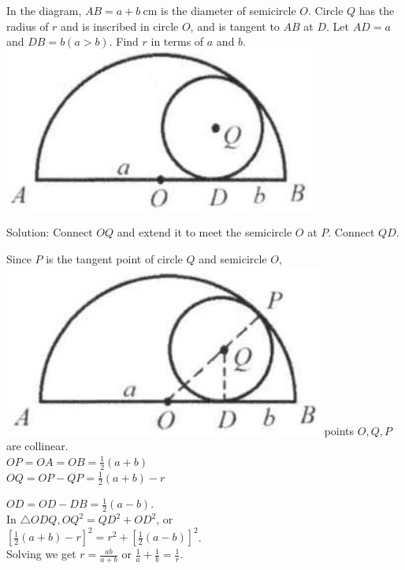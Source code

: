 \documentclass{article}
\begin{document}
In the diagram, \(A B=a+b \mathrm{~cm}\) is the diameter of semicircle \(O\). Circle \(Q\) has the radius of \(r\) and is inscribed in circle \(O\), and is tangent to \(A B\) at \(D\). Let \(A D=a\) and \(D B=b(a>b)\). Find \(r\) in terms of \(a\) and \(b\).\\
\centering
\includegraphics[width=\textwidth]{images/178(1).jpg}

Solution:
Connect \(O Q\) and extend it to meet the semicircle \(O\) at \(P\). Connect \(Q D\).

Since \(P\) is the tangent point of circle \(Q\) and semicircle \(O\),\\
\includegraphics[width=\textwidth]{images/178(2).jpg} points \(O, Q, P\) are collinear.\\
\(O P=O A=O B=\frac{1}{2}(a+b)\)\\
\(O Q=O P-Q P=\frac{1}{2}(a+b)-r\)


\(O D=O D-D B=\frac{1}{2}(a-b)\).\\
In \(\triangle O D Q, O Q^{2}=Q D^{2}+O D^{2}\), or\\
\(\left[\frac{1}{2}(a+b)-r\right]^{2}=r^{2}+\left[\frac{1}{2}(a-b)\right]^{2}\).\\
Solving we get \(r=\frac{a b}{a+b}\) or \(\frac{1}{a}+\frac{1}{b}=\frac{1}{r}\).
\end{document}
